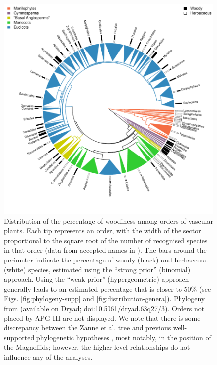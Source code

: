 \begin{figure}[p]
  \centering
  \includegraphics[width=\textwidth]{figs/fraction-on-phylogeny}
  \caption[Distribution of the fraction of woodiness among orders of vascular
  plants I]{Distribution of the percentage of woodiness among orders of
    vascular plants.  Each tip represents an order, with the width of
    the sector proportional to the square root of the number of
    recognised species in that order (data from accepted names in
    \citealt{theplantlist}).  The bars around the perimeter indicate the
    percentage of woody (black) and herbaceous (white) species,
    estimated using the ``strong prior'' (binomial) approach.  Using
    the ``weak prior'' (hypergeometric) approach generally leads to an
    estimated percentage that is closer to 50\% (see Figs.
    \ref{fig:phylogeny-supp} and \ref{fig:distribution-genera}).
    Phylogeny from \citet{Zanne} (available on Dryad; 
    doi:10.5061/dryad.63q27/3). Orders not placed by APG III
    \citep{APG3} are not displayed. We note that there is some discrepancy between
    the Zanne et al. tree and previous well-supported
    phylogenetic hypotheses \citep[e.g.,][]{Soltis2011}, most notably, in the
    position of the Magnoliids; however, the higher-level relationships 
    do not influence any of the analyses.}
\label{fig:phylogeny}
\end{figure}

